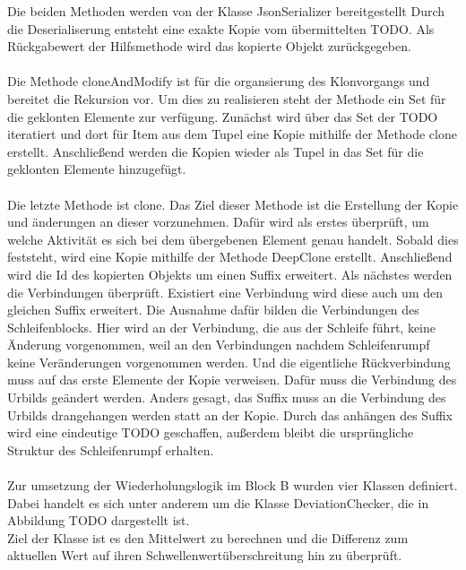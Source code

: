 \documentclass{article}
\begin{document}
    Die beiden Methoden werden von der Klasse JsonSerializer bereitgestellt
    Durch die Deserialiserung entsteht eine exakte Kopie vom übermittelten TODO.
    Als Rückgabewert der Hilfsmethode wird das kopierte Objekt zurückgegeben.\\
    \\
    Die Methode cloneAndModify ist für die organsierung des Klonvorgangs und bereitet die Rekursion vor.
    Um dies zu realisieren steht der Methode ein Set für die geklonten Elemente zur verfügung.
    Zunächst wird über das Set der TODO iteratiert und dort für Item aus dem Tupel eine Kopie mithilfe der Methode clone erstellt.
    Anschließend werden die Kopien wieder als Tupel in das Set für die geklonten Elemente hinzugefügt.\\
    \\
    Die letzte Methode ist clone.
    Das Ziel dieser Methode ist die Erstellung der Kopie und änderungen an dieser vorzunehmen.
    Dafür wird als erstes überprüft, um welche Aktivität es sich bei dem übergebenen Element genau handelt.
    Sobald dies feststeht, wird eine Kopie mithilfe der Methode DeepClone erstellt.
    Anschließend wird die Id des kopierten Objekts um einen Suffix erweitert.
    Als nächstes werden die Verbindungen überprüft. 
    Existiert eine Verbindung wird diese auch um den gleichen Suffix erweitert.
    Die Ausnahme dafür bilden die Verbindungen des Schleifenblocks.
    Hier wird an der Verbindung, die aus der Schleife führt, keine Änderung vorgenommen, weil an den Verbindungen nachdem Schleifenrumpf keine Veränderungen vorgenommen werden.
    Und die eigentliche Rückverbindung muss auf das erste Elemente der Kopie verweisen. 
    Dafür muss die Verbindung des Urbilds geändert werden.
    Anders gesagt, das Suffix muss an die Verbindung des Urbilds drangehangen werden statt an der Kopie.
    Durch das anhängen des Suffix wird eine eindeutige TODO geschaffen, außerdem bleibt die ursprüngliche Struktur des Schleifenrumpf erhalten.\\
    \\ 
    Zur umsetzung der Wiederholungslogik im Block B wurden vier Klassen definiert.
    Dabei handelt es sich unter anderem um die Klasse DeviationChecker, die in Abbildung TODO dargestellt ist.\\
    Ziel der Klasse ist es den Mittelwert zu berechnen und die Differenz zum aktuellen Wert auf ihren Schwellenwertüberschreitung hin zu überprüft.
\end{document}
